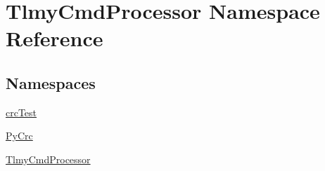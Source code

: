 \hypertarget{namespace_tlmy_cmd_processor}{}\section{Tlmy\+Cmd\+Processor Namespace Reference}
\label{namespace_tlmy_cmd_processor}
\subsection*{Namespaces}
\begin{DoxyCompactItemize}
\item 
 \hyperlink{namespace_tlmy_cmd_processor_1_1crc_test}{crc\+Test}
\item 
 \hyperlink{namespace_tlmy_cmd_processor_1_1_py_crc}{Py\+Crc}
\item 
 \hyperlink{namespace_tlmy_cmd_processor_1_1_tlmy_cmd_processor}{Tlmy\+Cmd\+Processor}
\end{DoxyCompactItemize}
